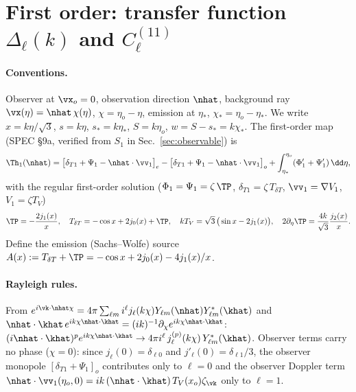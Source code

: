 \section{First order: transfer function $\Delta_\ell(k)$ and $C_\ell^{(11)}$}\label{sec:linear}

\paragraph{Conventions.}  Observer at $\vx_o=0$, observation direction $\nhat$, background ray
$\vx(\eta)=\nhat\,\chi(\eta)$, $\chi=\eta_o-\eta$, emission at $\eta_*$, $\chi_*=\eta_o-\eta_*$.  We write
$x=k\eta/\sqrt3$, $s=k\eta$, $s_*=k\eta_*$, $S=k\eta_o$, $w=S-s_*=k\chi_*$.  The first-order map (SPEC \S9a, verified from
$S_1$ in Sec.~\ref{sec:observable}) is
\begin{equation}
\Th_1(\nhat)=\big[\delta_{T1}+\Psi_1-\nhat\cdot\vv_1\big]_e-\big[\delta_{T1}+\Psi_1-\nhat\cdot\vv_1\big]_o
+\int_{\eta_*}^{\eta_o}(\Phi_1'+\Psi_1')\,\dd\eta ,
\end{equation}
with the regular first-order solution ($\Phi_1=\Psi_1=\zeta\,\TP$, $\delta_{T1}=\zeta\,T_{\delta T}$, $\vv_1=\nabla V_1$, $V_1=\zeta T_V$)
\begin{equation}
\TP=-\frac{2j_1(x)}{x},\quad T_{\delta T}=-\cos x+2j_0(x)+\TP,\quad kT_V=\sqrt3\,\big(\sin x-2j_1(x)\big),\quad
2\partial_\eta\TP=\frac{4k}{\sqrt3}\frac{j_2(x)}{x}.
\end{equation}
Define the emission (Sachs--Wolfe) source $A(x):=T_{\delta T}+\TP=-\cos x+2j_0(x)-4j_1(x)/x$.

\paragraph{Rayleigh rules.}  From $e^{i\vk\cdot\nhat\chi}=4\pi\sum_{\ell m}i^\ell j_\ell(k\chi)Y_{\ell m}(\nhat)Y^*_{\ell m}(\khat)$
and $\nhat\cdot\khat\,e^{ik\chi\nhat\cdot\khat}=(ik)^{-1}\partial_\chi e^{ik\chi\nhat\cdot\khat}$:
$(i\nhat\cdot\khat)^p e^{ik\chi\nhat\cdot\khat}\to 4\pi i^\ell\,j_\ell^{(p)}(k\chi)\,Y^*_{\ell m}(\khat)$.
Observer terms carry no phase ($\chi=0$): since $j_\ell(0)=\delta_{\ell0}$ and $j'_\ell(0)=\delta_{\ell1}/3$, the observer
monopole $[\delta_{T1}+\Psi_1]_o$ contributes only to $\ell=0$ and the observer Doppler term
$\nhat\cdot\vv_1(\eta_o,0)=i k\,(\nhat\cdot\khat)\,T_V(x_o)\zeta_\vk$ only to $\ell=1$.

